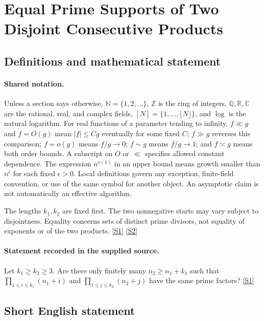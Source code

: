 \documentclass[11pt,a4paper]{article}
\newcommand{\N}{\mathbb{N}}
\newcommand{\Z}{\mathbb{Z}}
\newcommand{\Q}{\mathbb{Q}}
\newcommand{\R}{\mathbb{R}}
\newcommand{\C}{\mathbb{C}}
\newcommand{\sref}[2]{\hyperlink{source:#1:#2}{[S#2]}}
\begin{document}
\section{Equal Prime Supports of Two Disjoint Consecutive Products}\label{statement}


\subsection{Definitions and mathematical statement}

\paragraph{Shared notation.}Unless a section says otherwise, $\N=\{1,2,\ldots\}$,
$\Z$ is the ring of integers, $\Q,\R,\C$ are the rational, real, and complex
fields, $[N]=\{1,\ldots,\lfloor N\rfloor\}$, and $\log$ is the natural
logarithm. For real functions of a parameter tending to infinity,
$f\ll g$ and $f=O(g)$ mean $|f|\leq Cg$ eventually for some fixed $C$;
$f\gg g$ reverses this comparison; $f=o(g)$ means $f/g\to0$;
$f\sim g$ means $f/g\to1$; and $f\asymp g$ means both order bounds.
A subscript on $O$ or $\ll$ specifies allowed constant dependence.
The expression $n^{o(1)}$ in an upper bound means growth smaller than
$n^\epsilon$ for each fixed $\epsilon>0$. Local definitions govern any
exception, finite-field convention, or use of the same symbol for another
object. An asymptotic claim is not automatically an effective algorithm.



The lengths $k_1,k_2$ are fixed first. The two nonnegative starts may vary subject to disjointness. Equality concerns sets of distinct prime divisors, not equality of exponents or of the two products. \sref{statement}{1} \sref{statement}{2}

\paragraph{Statement recorded in the supplied source.}
Let $k_1\geq k_2\geq 3$. Are there only finitely many $n_2\geq n_1+k_1$ such that $ \prod_{1\leq i\leq k_1}(n_1+i)\textrm{ and }\prod_{1\leq j\leq k_2}(n_2+j) $ have the same prime factors? \sref{statement}{1}

\subsection{Short English statement}
\end{document}
